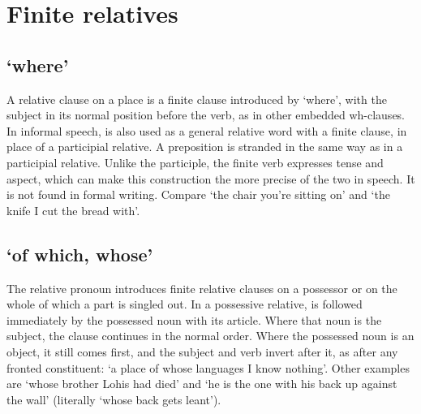 \section{Finite relatives}\label{sec:finite-relatives}

\subsection{ `where'}
A relative clause on a place is a finite clause introduced by  `where', with the subject in its normal position before the verb, as in other embedded wh-clauses.
In informal speech,  is also used as a general relative word with a finite clause, in place of a participial relative. A preposition is stranded in the same way as in a participial relative. Unlike the participle, the finite verb expresses tense and aspect, which can make this construction the more precise of the two in speech. It is not found in formal writing.
Compare  `the chair you're sitting on' and  `the knife I cut the bread with'.

\subsection{ `of which, whose'}
The relative pronoun  introduces finite relative clauses on a possessor or on the whole of which a part is singled out. In a possessive relative,  is followed immediately by the possessed noun with its article. Where that noun is the subject, the clause continues in the normal order.
Where the possessed noun is an object, it still comes first, and the subject and verb invert after it, as after any fronted constituent:  `a place of whose languages I know nothing'. Other examples are  `whose brother Lohis had died' and  `he is the one with his back up against the wall' (literally `whose back gets leant').

